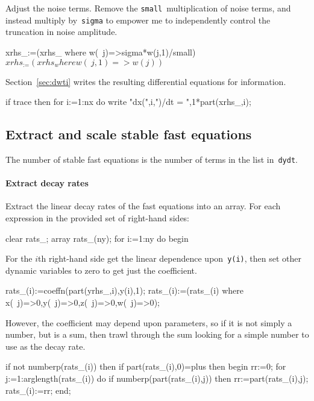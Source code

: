 \documentclass[11pt,a5paper]{article}
\begin{document}
Adjust the noise terms.
Remove the \verb|small|~multiplication of noise terms, and instead multiply by~\verb|sigma| to empower me to independently control the truncation in noise amplitude.
\begin{reduce}
xrhs_:=(xrhs_ where w(~j)=>sigma*w(j,1)/small)$
xrhs_:=(xrhs_ where w(~j,1)=>w(j))$
\end{reduce}

Section~\ref{sec:dwti} writes the resulting differential equations for information.
\begin{reduce}
if trace then for i:=1:nx do 
    write "dx(",i,")/dt = ",1*part(xrhs_,i);
\end{reduce}


\subsection{Extract and scale stable fast equations}

The number of stable fast equations is the number of terms in the list in~\verb|dydt|.

\paragraph{Extract decay rates}
Extract the linear decay rates of the fast equations into an array.
For each expression in the provided set of right-hand sides:
\begin{reduce}
clear rats_; array rats_(ny);
for i:=1:ny do begin
\end{reduce}

For the $i$th right-hand side get the linear dependence upon~\verb|y(i)|, then set other dynamic variables to zero to get just the coefficient.
\begin{reduce}
  rats_(i):=coeffn(part(yrhs_,i),y(i),1);
  rats_(i):=(rats_(i) where {x(~j)=>0,y(~j)=>0,z(~j)=>0,w(~j)=>0});
\end{reduce}

However, the coefficient may depend upon parameters, so if it is not simply a number, but is a sum, then trawl through the sum looking for a simple number to use as the decay rate.
\begin{reduce}
  if not numberp(rats_(i)) then 
  if part(rats_(i),0)=plus then begin
    rr:=0;
    for j:=1:arglength(rats_(i)) do 
      if numberp(part(rats_(i),j)) 
      then rr:=part(rats_(i),j);
    rats_(i):=rr;
  end;
\end{reduce}
\end{document}
